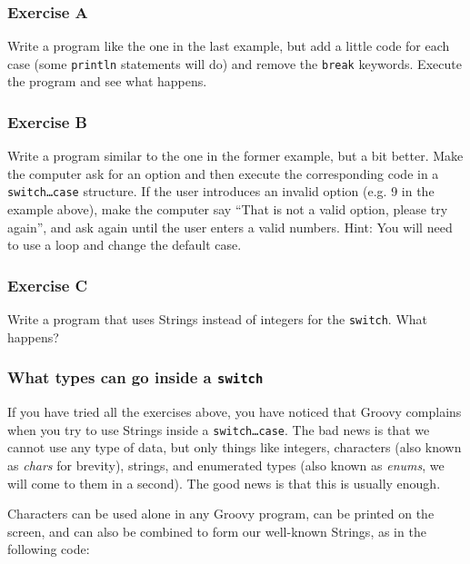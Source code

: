 \subsubsection*{Exercise A}

Write a program like the one in the last example, but add a little
code for each case (some \texttt{println} statements will do) and
remove the \texttt{break} keywords. Execute the program and see what
happens. 

\subsubsection*{Exercise B}

Write a program similar to the one in the former example, but a bit
better. Make the computer ask for an option and then execute the
corresponding code in a \texttt{switch\ldots case} structure. If the
user introduces an invalid option (e.g. 9 in the example above), make
the computer say ``That is not a valid option, please try again'', and
ask again until the user enters a valid numbers. Hint: You will need
to use a loop and change the default case. 

\subsubsection*{Exercise C}

Write a program that uses Strings instead of integers for the
\texttt{switch}. What happens?

\subsubsection{What types can go inside a \texttt{switch}}
\label{sec:what-types-can}

If you have tried all the exercises above, you have noticed that
Groovy complains when you try to use Strings inside a
\texttt{switch\ldots case}. The bad news is that we cannot use any
type of data, but only things like integers, characters (also known as
\emph{chars} for brevity), strings, and enumerated types (also known as
\emph{enums}, we will come to them in a second). The good news is that
this is usually enough.

Characters can be used alone in any Groovy program, can be printed on
the screen, and can also be
combined to form our well-known Strings, as in the following code: 


